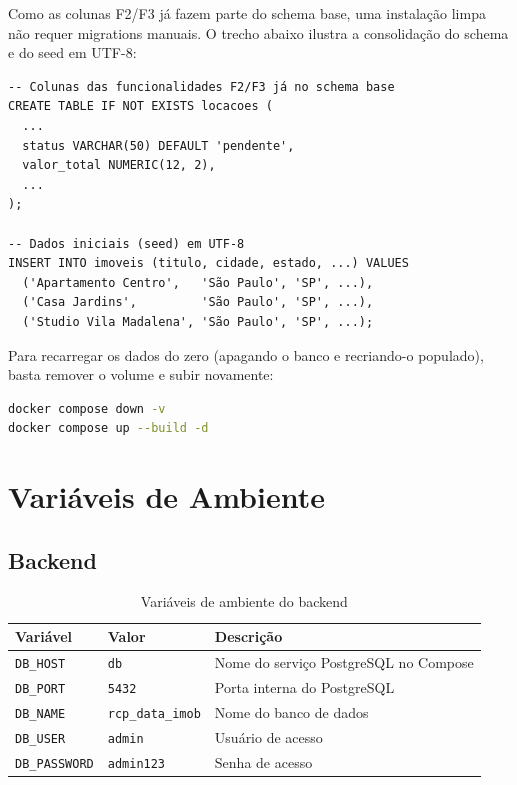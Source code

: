 \documentclass[12pt, a4paper]{article}
\newcommand{\thead}[1]{\cellcolor{tableheader}\color{white}\bfseries #1}
\newcommand{\talt}{\rowcolor{tablerowalt}}
\begin{document}
Como as colunas F2/F3 já fazem parte do schema base, uma instalação limpa não requer migrations
manuais. O trecho abaixo ilustra a consolidação do schema e do seed em UTF-8:

\begin{lstlisting}[language={}]
-- Colunas das funcionalidades F2/F3 já no schema base
CREATE TABLE IF NOT EXISTS locacoes (
  ...
  status VARCHAR(50) DEFAULT 'pendente',
  valor_total NUMERIC(12, 2),
  ...
);

-- Dados iniciais (seed) em UTF-8
INSERT INTO imoveis (titulo, cidade, estado, ...) VALUES
  ('Apartamento Centro',   'São Paulo', 'SP', ...),
  ('Casa Jardins',         'São Paulo', 'SP', ...),
  ('Studio Vila Madalena', 'São Paulo', 'SP', ...);
\end{lstlisting}

Para recarregar os dados do zero (apagando o banco e recriando-o populado), basta remover o volume
e subir novamente:

\begin{lstlisting}[language=Bash]
docker compose down -v
docker compose up --build -d
\end{lstlisting}

\section{Variáveis de Ambiente}

\subsection{Backend}

\begin{table}[H]
\centering
\begin{tabularx}{\textwidth}{|l|l|X|}
\hline
\thead{Variável} & \thead{Valor} & \thead{Descrição} \\
\hline
\texttt{DB\_HOST}     & \texttt{db}             & Nome do serviço PostgreSQL no Compose \\
\talt \texttt{DB\_PORT}     & \texttt{5432}           & Porta interna do PostgreSQL \\
\texttt{DB\_NAME}     & \texttt{rcp\_data\_imob} & Nome do banco de dados \\
\talt \texttt{DB\_USER}     & \texttt{admin}          & Usuário de acesso \\
\texttt{DB\_PASSWORD} & \texttt{admin123}       & Senha de acesso \\
\hline
\end{tabularx}
\caption{Variáveis de ambiente do backend}
\end{table}
\end{document}
